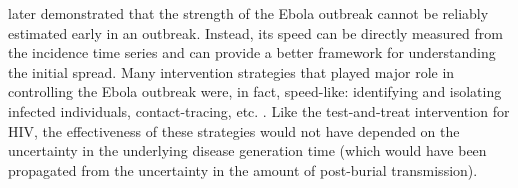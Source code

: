 \documentclass[12pt]{article}
\begin{document}
\cite{weitz2015modeling} later demonstrated that the strength of the Ebola outbreak cannot be reliably estimated early in an outbreak.
Instead, its speed can be directly measured from the incidence time series \citep{chowell2003sars, mills2004transmissibility, nishiura2009transmission, nishiura2010pros, ma2014estimating} and can provide a better framework for understanding the initial spread.
Many intervention strategies that played major role in controlling the Ebola outbreak were, in fact, speed-like: identifying and isolating infected individuals, contact-tracing, etc. \citep{pandey2014strategies}.
Like the test-and-treat intervention for HIV, the effectiveness of these strategies would not have depended on the uncertainty in the underlying disease generation time (which would have been propagated from the uncertainty in the amount of post-burial transmission).




\end{document}
